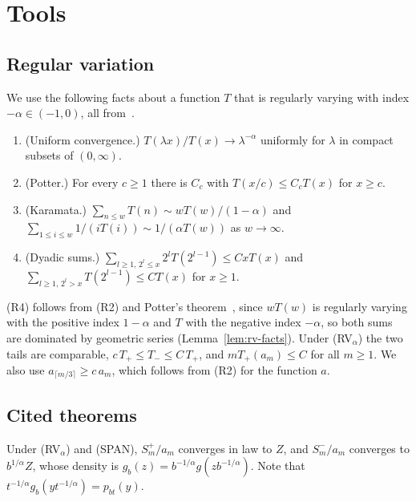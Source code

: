 \section{Tools}\label{sec:tools}

\subsection{Regular variation}\label{sec:rv}

We use the following facts about a function $T$ that is regularly varying with
index $-\alpha\in(-1,0)$, all from~\cite[Sections~1.2 to~1.5]{bgt1989}.
\begin{enumerate}[(R1)]
\item (Uniform convergence.) $T(\lambda x)/T(x)\to\lambda^{-\alpha}$ uniformly for
$\lambda$ in compact subsets of $(0,\infty)$.
\item (Potter.) For every $c\ge1$ there is $C_c$ with $T(x/c)\le C_cT(x)$ for $x\ge c$.
\item (Karamata.) $\sum_{n\le w}T(n)\sim wT(w)/(1-\alpha)$ and
$\sum_{1\le i\le w}1/(iT(i))\sim1/(\alpha T(w))$ as $w\to\infty$.
\item (Dyadic sums.) $\sum_{l\ge1,\,2^l\le x}2^lT(2^{l-1})\le CxT(x)$ and
$\sum_{l\ge1,\,2^l>x}T(2^{l-1})\le CT(x)$ for $x\ge1$.
\end{enumerate}
(R4) follows from (R2) and Potter's theorem~\cite[Theorem~1.5.6]{bgt1989}, since $wT(w)$ is regularly varying with the
positive index $1-\alpha$ and $T$ with the negative index $-\alpha$, so both sums are
dominated by geometric series (Lemma~\ref{lem:rv-facts}). Under (RV$_\alpha$) the two tails are comparable,
$c\,T_\plus\le T_\minus\le C\,T_\plus$, and $mT_\plus(a_m)\le C$ for all $m\ge1$. We
also use $a_{\lceil m/3\rceil}\ge c\,a_m$, which follows from (R2) for the function
$a$.

\subsection{Cited theorems}\label{sec:cited}

Under (RV$_\alpha$) and (SPAN), $S^\plus_m/a_m$ converges in law to $Z$, and
$S^\minus_m/a_m$ converges to $b^{1/\alpha}Z$, whose density is
$g_b(z)=b^{-1/\alpha}g(zb^{-1/\alpha})$. Note that $t^{-1/\alpha}g_b(yt^{-1/\alpha})=p_{bt}(y)$.

